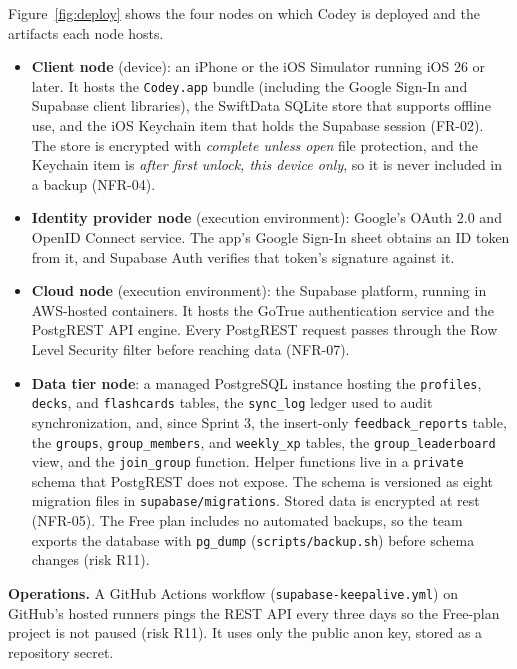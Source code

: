 \documentclass[12pt,letterpaper]{article}
\newcommand{\st}[1]{\guillemotleft#1\guillemotright}   %
\begin{document}
Figure~\ref{fig:deploy} shows the four nodes on which Codey is deployed and the
artifacts each node hosts.
\begin{itemize}
  \item \textbf{Client node} (\st{device}): an iPhone or the iOS Simulator running
        iOS 26 or later. It hosts the \texttt{Codey.app} bundle (including the Google
        Sign-In and Supabase client libraries), the SwiftData SQLite store that
        supports offline use, and the iOS Keychain item that holds the Supabase
        session (FR-02). The store is encrypted with \emph{complete unless open} file
        protection, and the Keychain item is \emph{after first unlock, this device
        only}, so it is never included in a backup (NFR-04).
  \item \textbf{Identity provider node} (\st{execution environment}): Google's OAuth
        2.0 and OpenID Connect service. The app's Google Sign-In sheet obtains an ID
        token from it, and Supabase Auth verifies that token's signature against it.
  \item \textbf{Cloud node} (\st{execution environment}): the Supabase platform,
        running in AWS-hosted containers. It hosts the GoTrue authentication service
        and the PostgREST API engine. Every PostgREST request passes through the Row
        Level Security filter before reaching data (NFR-07).
  \item \textbf{Data tier node}: a managed PostgreSQL instance hosting the
        \texttt{profiles}, \texttt{decks}, and \texttt{flashcards} tables, the
        \texttt{sync\_log} ledger used to audit synchronization, and, since Sprint 3,
        the insert-only \texttt{feedback\_reports} table, the \texttt{groups},
        \texttt{group\_members}, and \texttt{weekly\_xp} tables, the
        \texttt{group\_leaderboard} view, and the \texttt{join\_group} function. Helper
        functions live in a \texttt{private} schema that PostgREST does not expose. The
        schema is versioned as eight migration files in \texttt{supabase/migrations}. Stored data is
        encrypted at rest (NFR-05). The Free plan includes no automated backups, so
        the team exports the database with \texttt{pg\_dump}
        (\texttt{scripts/backup.sh}) before schema changes (risk R11).
\end{itemize}

\textbf{Operations.} A GitHub Actions workflow (\texttt{supabase-keepalive.yml}) on
GitHub's hosted runners pings the REST API every three days so the Free-plan project is
not paused (risk R11). It uses only the public anon key, stored as a repository
secret.
\end{document}

